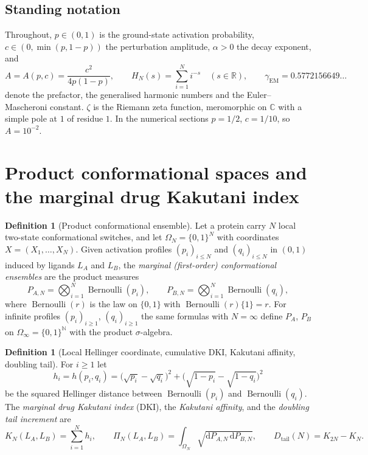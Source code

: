 \documentclass[11pt,reqno]{amsart}
\theoremstyle{plain}
\theoremstyle{definition}
\newtheorem{definition}[theorem]{Definition}
\theoremstyle{remark}
\numberwithin{equation}{section}
\DeclareMathOperator{\Bern}{Bernoulli}
\newcommand{\dd}{\mathrm{d}}
\newcommand{\Dtail}{D_{\mathrm{tail}}}
\newcommand{\Rr}{\mathbb{R}}
\newcommand{\Nn}{\mathbb{N}}
\newcommand{\LA}{L_A}
\newcommand{\LB}{L_B}
\newcommand{\PA}{P_{A}}
\newcommand{\PB}{P_{B}}
\newcommand{\PAN}{P_{A,N}}
\newcommand{\PBN}{P_{B,N}}
\begin{document}
\subsection*{Standing notation}
Throughout, $p\in(0,1)$ is the ground-state activation probability, $c\in(0,\min(p,1-p))$ the perturbation amplitude, $\alpha>0$ the decay exponent, and
\begin{equation}\label{eq:A}
A=A(p,c)=\frac{c^2}{4p(1-p)},\qquad H_N(s)=\sum_{i=1}^N i^{-s}\quad(s\in\Rr),\qquad \gamma_{\mathrm{EM}}=0.5772156649\ldots
\end{equation}
denote the prefactor, the generalised harmonic numbers and the Euler--Mascheroni constant. $\zeta$ is the Riemann zeta function, meromorphic on $\mathbb C$ with a simple pole at $1$ of residue $1$. In the numerical sections $p=1/2$, $c=1/10$, so $A=10^{-2}$.

\section{Product conformational spaces and the marginal drug Kakutani index}
\label{sec:dki}

\begin{definition}[Product conformational ensemble]\label{def:ensemble}
Let a protein carry $N$ local two-state conformational switches, and let $\Omega_N=\{0,1\}^N$ with coordinates $X=(X_1,\dots,X_N)$. Given activation profiles $(p_i)_{i\le N}$ and $(q_i)_{i\le N}$ in $(0,1)$ induced by ligands $\LA$ and $\LB$, the \emph{marginal (first-order) conformational ensembles} are the product measures
\begin{equation}\label{eq:product}
\PAN=\bigotimes_{i=1}^N\Bern(p_i),\qquad \PBN=\bigotimes_{i=1}^N\Bern(q_i),
\end{equation}
where $\Bern(r)$ is the law on $\{0,1\}$ with $\Bern(r)\{1\}=r$. For infinite profiles $(p_i)_{i\ge1}$, $(q_i)_{i\ge1}$ the same formulas with $N=\infty$ define $\PA$, $\PB$ on $\Omega_\infty=\{0,1\}^{\Nn}$ with the product $\sigma$-algebra.
\end{definition}

\begin{definition}[Local Hellinger coordinate, cumulative DKI, Kakutani affinity, doubling tail]\label{def:dki}
For $i\ge1$ let
\begin{equation}\label{eq:h}
h_i=h(p_i,q_i)=\bigl(\sqrt{p_i}-\sqrt{q_i}\bigr)^2+\bigl(\sqrt{1-p_i}-\sqrt{1-q_i}\bigr)^2
\end{equation}
be the squared Hellinger distance between $\Bern(p_i)$ and $\Bern(q_i)$. The \emph{marginal drug Kakutani index} (DKI), the \emph{Kakutani affinity}, and the \emph{doubling tail increment} are
\begin{equation}\label{eq:KPiD}
K_N(\LA,\LB)=\sum_{i=1}^N h_i,\qquad
\Pi_N(\LA,\LB)=\int_{\Omega_N}\sqrt{\dd\PAN\,\dd\PBN},\qquad
\Dtail(N)=K_{2N}-K_N .
\end{equation}
\end{definition}
\end{document}
